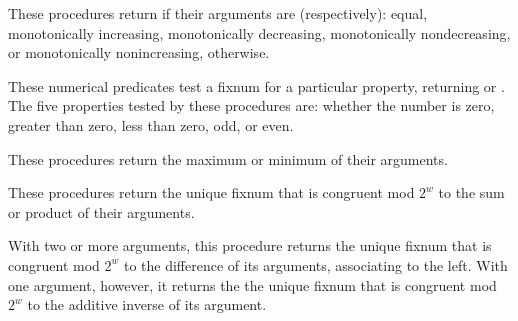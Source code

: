 \begin{entry}{%
}

These procedures return \schtrue{} if their arguments are (respectively):
equal, monotonically increasing, monotonically decreasing,
monotonically nondecreasing, or monotonically nonincreasing,
\schfalse{} otherwise.
\end{entry}

\begin{entry}{%
}

These numerical predicates test a fixnum for a particular property,
returning \schtrue{} or \schfalse{}.  The five properties tested by
these procedures are: whether the number is zero, greater than zero,
less than zero, odd, or even.
\end{entry}

\begin{entry}{%
}

These procedures return the maximum or minimum of their arguments.
\end{entry}

\begin{entry}{%
}

These procedures return the unique fixnum that is congruent mod $2^w$
to the sum or product of their arguments.
\end{entry}

\begin{entry}{%
}

With two or more arguments, this procedure returns the unique fixnum
that is congruent mod $2^w$ to the difference of its arguments,
associating to the left.  With one argument, however, it returns the
the unique fixnum that is congruent mod $2^w$ to the additive inverse
of its argument.
\end{entry}

